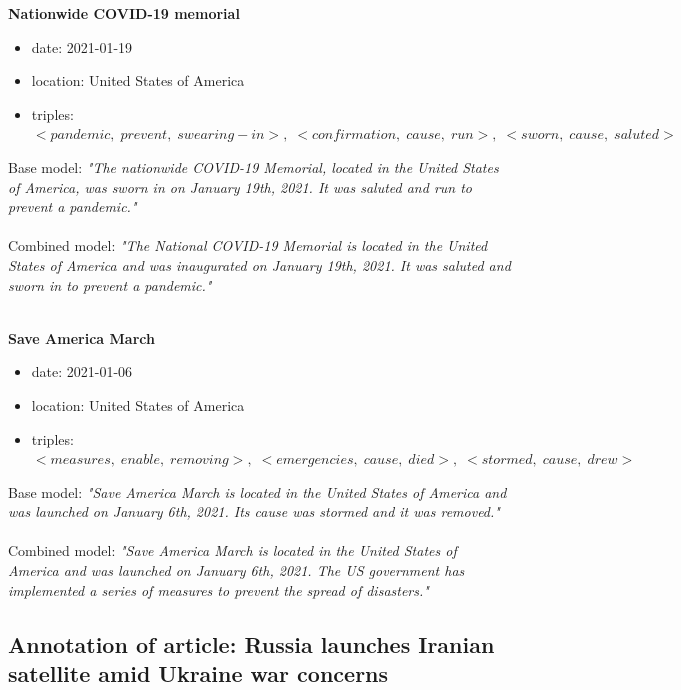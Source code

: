 \documentclass[
hf, %
]{ceurart}
\begin{document}
\textbf{Nationwide COVID-19 memorial}
\begin{itemize}
    \item date: 2021-01-19
    \item location: United States of America
    \item triples: $<pandemic,\;prevent,\;swearing-in>,\; <confirmation,\; cause,\; run>,\; <sworn,\; cause,\; saluted>$
\end{itemize}
Base model: \textit{"The nationwide COVID-19 Memorial, located in the United States of America, was sworn in on January 19th, 2021. It was saluted and run to prevent a pandemic."}\\\\
\noindent
Combined model: \textit{"The National COVID-19 Memorial is located in the United States of America and was inaugurated 
on January 19th, 2021. It was saluted and sworn in to prevent a pandemic."}\\\\
\noindent

\textbf{Save America March}
\begin{itemize}
    \item date: 2021-01-06
    \item location: United States of America
    \item triples: $<measures,\;enable,\;removing>,\; <emergencies,\; cause,\; died>,\; <stormed,\; cause,\; drew>$
\end{itemize}
Base model: \textit{"Save America March is located in the United States of America and was launched on January 6th, 2021. Its cause was stormed and it was removed."}\\\\
\noindent
Combined model: \textit{"Save America March is located in the United States of America and was launched on January 6th, 2021. The US government has implemented a series of measures to prevent the spread of disasters."}



\subsection{Annotation of article: Russia launches Iranian satellite amid Ukraine war concerns}
\label{appx:article_annotation}
\end{document}
